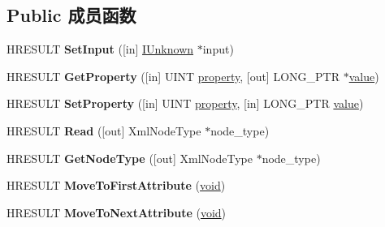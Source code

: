 \subsection*{Public 成员函数}
\begin{DoxyCompactItemize}
\item 
\mbox{\label{interface_i_xml_reader_aff62aaa5f7a54aaff6d31d852d6c0d87}} 
H\+R\+E\+S\+U\+LT {\bfseries Set\+Input} (\mbox{[}in\mbox{]} \hyperlink{interface_i_unknown}{I\+Unknown} $\ast$input)
\item 
\mbox{\label{interface_i_xml_reader_a2c387aeea7eedf0ae8351ed3fe801db8}} 
H\+R\+E\+S\+U\+LT {\bfseries Get\+Property} (\mbox{[}in\mbox{]} U\+I\+NT \hyperlink{structproperty}{property}, \mbox{[}out\mbox{]} L\+O\+N\+G\+\_\+\+P\+TR $\ast$\hyperlink{unionvalue}{value})
\item 
\mbox{\label{interface_i_xml_reader_abca4a599592a33712d30f1e4a152567b}} 
H\+R\+E\+S\+U\+LT {\bfseries Set\+Property} (\mbox{[}in\mbox{]} U\+I\+NT \hyperlink{structproperty}{property}, \mbox{[}in\mbox{]} L\+O\+N\+G\+\_\+\+P\+TR \hyperlink{unionvalue}{value})
\item 
\mbox{\label{interface_i_xml_reader_adbbd87dc776ea03e6e50cb20e4d75cd3}} 
H\+R\+E\+S\+U\+LT {\bfseries Read} (\mbox{[}out\mbox{]} Xml\+Node\+Type $\ast$node\+\_\+type)
\item 
\mbox{\label{interface_i_xml_reader_ab7460fb33ac1f47ba512c94e3937673f}} 
H\+R\+E\+S\+U\+LT {\bfseries Get\+Node\+Type} (\mbox{[}out\mbox{]} Xml\+Node\+Type $\ast$node\+\_\+type)
\item 
\mbox{\label{interface_i_xml_reader_a5c7eaba169d1158335063907fda526ac}} 
H\+R\+E\+S\+U\+LT {\bfseries Move\+To\+First\+Attribute} (\hyperlink{interfacevoid}{void})
\item 
\mbox{\label{interface_i_xml_reader_a6172437c3b15035ccfd094ce434106e0}} 
H\+R\+E\+S\+U\+LT {\bfseries Move\+To\+Next\+Attribute} (\hyperlink{interfacevoid}{void})
\item 
\mbox{\label{interface_i_xml_reader_a7193fb07c594b61e8813d974a32594ed}} 

\end{DoxyCompactItemize}
